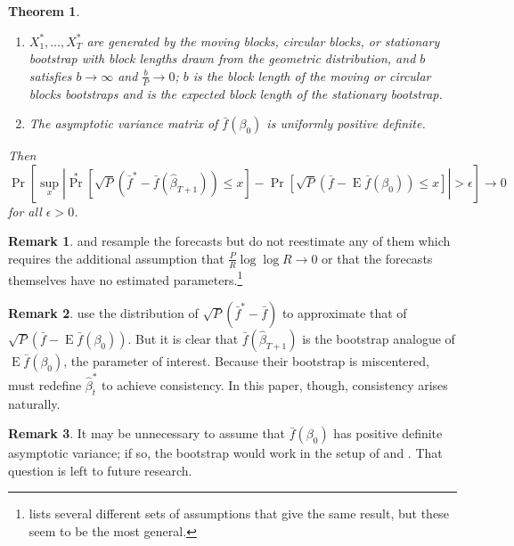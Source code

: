 \documentclass[11pt,fleqn]{article}
\newtheorem{thm}{Theorem}
\theoremstyle{definition}
\newtheorem{rem}{Remark}
\DeclareMathOperator{\E}{E}
\DeclareMathOperator{\pr}{Pr}
\begin{document}
\begin{thm}
\begin{enumerate}
  \item $X_1^{*},\dots,X_T^{*}$ are generated by the moving blocks,
    circular blocks, or stationary bootstrap with block lengths drawn
    from the geometric distribution, and $b$ satisfies $b \to \infty$
    and $\frac{b}{P} \to 0$; $b$ is the block length of the moving or
    circular blocks bootstraps and is the expected block length of the
    stationary bootstrap.
  \item The asymptotic variance matrix of $\bar{f}(\beta_0)$ is
    uniformly positive definite.
  \end{enumerate}
  Then
  \begin{equation}
    \pr[\sup_x | \pr^*[\sqrt{P} (\bar{f}^* - \bar{f}(\hat{\beta}_{T+1}))
        \leq x] - \pr[\sqrt{P}( \bar{f} - \E \bar{f}(\beta_0)) \leq x] | >
      \epsilon] \to 0
  \end{equation}
  for all $\epsilon > 0$.
\end{thm}

\begin{rem}
  \citet{Whi:00} and \citet{Han:05} resample the forecasts but do not
  reestimate any of them which requires the additional assumption that
  $\tfrac{P}{R} \log \log R \to 0$ or that the forecasts themselves
  have no estimated parameters.\footnote{\citet{Whi:00} lists several
    different sets of assumptions that give the same result, but these
    seem to be the most general.}
\end{rem}

\begin{rem}
  \citet{CoS:07} use the distribution of $\sqrt{P}(\bar{f}^{*} -
  \bar{f})$ to approximate that of $\sqrt{P}(\bar{f} - \E
  \bar{f}(\beta_0))$.  But it is clear that
  $\bar{f}(\hat{\beta}_{T+1})$ is the bootstrap analogue of $\E
  \bar{f}(\beta_0)$, the parameter of interest.  Because their
  bootstrap is miscentered, \citet{CoS:07} must redefine
  $\hat{\beta}_t^{*}$ to achieve consistency.  In this paper, though,
  consistency arises naturally.
\end{rem}

\begin{rem}
  It may be unnecessary to assume that $\bar{f}(\beta_0)$ has positive
  definite asymptotic variance; if so, the bootstrap would work in the
  setup of \citet{ClM:05,ClM:01} and \citet{Mcc:07}.  That question is
  left to future research.
\end{rem}
\end{document}
